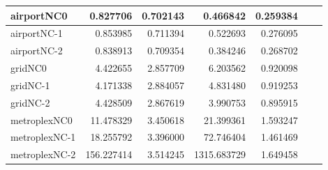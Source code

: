 \begin{longtable}{|l|r|r|r|r|r|r|}
airportNC0 & 0.827706 & 0.702143 & 0.466842 & 0.259384 \\ \hline
airportNC-1 & 0.853985 & 0.711394 & 0.522693 & 0.276095 \\ \hline
airportNC-2 & 0.838913 & 0.709354 & 0.384246 & 0.268702 \\ \hline
gridNC0 & 4.422655 & 2.857709 & 6.203562 & 0.920098 \\ \hline
gridNC-1 & 4.171338 & 2.884057 & 4.831480 & 0.919253 \\ \hline
gridNC-2 & 4.428509 & 2.867619 & 3.990753 & 0.895915 \\ \hline
metroplexNC0 & 11.478329 & 3.450618 & 21.399361 & 1.593247 \\ \hline
metroplexNC-1 & 18.255792 & 3.396000 & 72.746404 & 1.461469 \\ \hline
metroplexNC-2 & 156.227414 & 3.514245 & 1315.683729 & 1.649458 \\ \hline
\end{longtable}
